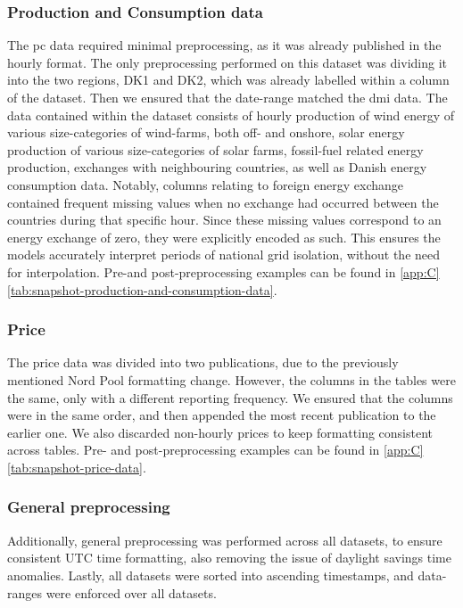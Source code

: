\subsubsection{Production and Consumption data}
The \gls{pc} data required minimal preprocessing, as it was already published
in the hourly format. The only preprocessing performed on
this dataset was dividing it into the two regions, DK1 and
DK2, which was already labelled within a column of the
dataset. Then we ensured that the date-range matched the
\gls{dmi} data. The data contained within the dataset consists of
hourly production of wind energy of various size-categories of
wind-farms, both off- and onshore, solar energy production of
various size-categories of solar farms, fossil-fuel related energy
production, exchanges with neighbouring countries, as well as
Danish energy consumption data. Notably, columns relating
to foreign energy exchange contained frequent missing values
when no exchange had occurred between the countries during
that specific hour. Since these missing values correspond to
an energy exchange of zero, they were explicitly encoded as
such. This ensures the models accurately interpret periods of
national grid isolation, without the need for interpolation. Pre-and 
post-preprocessing examples can be found in 
\cref{app:C} 
\autoref{tab:snapshot-production-and-consumption-data}.

\subsubsection{Price}
The price data was divided into two publications,
due to the previously mentioned Nord Pool formatting change.
However, the columns in the tables were the same, only with
a different reporting frequency. We ensured that the columns
were in the same order, and then appended the most recent
publication to the earlier one. We also discarded non-hourly
prices to keep formatting consistent across tables. Pre- and post-preprocessing 
examples can be found in \cref{app:C} 
\autoref{tab:snapshot-price-data}. 

\subsubsection{General preprocessing}
Additionally, general preprocessing was performed 
across all datasets, to 
ensure consistent
UTC time formatting, also removing the issue of daylight
savings time anomalies. Lastly, all datasets were sorted into
ascending timestamps, and data-ranges were enforced over all
datasets.

